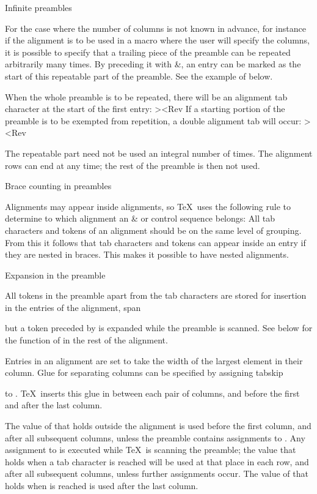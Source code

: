 \spoint Infinite preambles

For the case where the number of columns is not known in advance,
for instance if the alignment is to be used in a macro where
the user will specify the columns, it is possible to
specify that a trailing piece of the
preamble can be repeated arbitrarily many times.
By preceding it with \n\&, an entry can be marked as the
start of this repeatable part of the preamble.
See the example of  below.

When the whole preamble is to be repeated, there will be
an alignment tab character at the start of the first entry:
\Ver><Rev
If a starting portion of the preamble is to be exempted from
repetition, a double alignment tab will occur:
\Ver><Rev

The  repeatable part need not be used an integral
number of times. The alignment rows can end at any time;
the rest of the preamble is then not used.

\spoint Brace counting in preambles

Alignments may appear inside alignments, so \TeX\ uses the
following rule to determine to which alignment
an \n\&  or  control sequence belongs:
\disp All tab characters and  tokens of an alignment
      should be on the same level of grouping.\dispstop
From this it follows that tab characters and  tokens
can appear inside an entry if they are nested in braces.
This makes it possible to have nested alignments.

\spoint Expansion in the preamble

All tokens in the preamble \ldash apart from the tab characters \rdash
are stored for insertion in the entries of the alignment,
\csterm span\par
but a token preceded by  is expanded while
the preamble is scanned. See below for the function of
 in the rest of the alignment.

\spoint {}

Entries in an alignment are set to take the width of the
largest element in their column.
Glue for separating columns can be specified by assigning
\csterm tabskip\par
to .
\altt
\TeX\ inserts this glue in
between each pair of columns, and before the first and after the
last column.

The value of  that holds outside the alignment is
used before the first column, and after all subsequent columns,
unless the preamble contains assignments to .
Any assignment to  is executed while \TeX\ is scanning
the preamble; the value that holds when a tab character is
reached will be used at that place in each row, and after all subsequent
columns, unless further assignments occur.
The value of  that holds when  is reached
is used after the last column.

